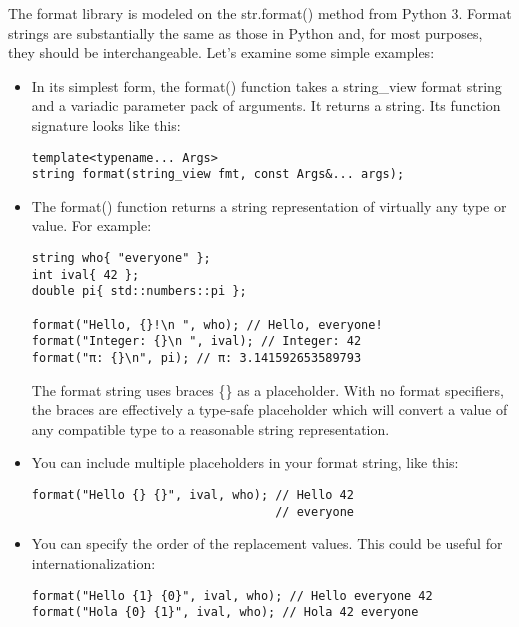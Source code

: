 The format library is modeled on the str.format() method from Python 3. Format strings are substantially the same as those in Python and, for most purposes, they should be interchangeable. Let's examine some simple examples:

\begin{itemize}
\item 
In its simplest form, the format() function takes a string\_view format string and a variadic parameter pack of arguments. It returns a string. Its function signature looks like this:

\begin{lstlisting}[style=styleCXX]
template<typename... Args>
string format(string_view fmt, const Args&... args);
\end{lstlisting}

\item 
The format() function returns a string representation of virtually any type or value. For example:

\begin{lstlisting}[style=styleCXX]
string who{ "everyone" };
int ival{ 42 };
double pi{ std::numbers::pi };

format("Hello, {}!\n ", who); // Hello, everyone!
format("Integer: {}\n ", ival); // Integer: 42
format("π: {}\n", pi); // π: 3.141592653589793
\end{lstlisting}

The format string uses braces \{\} as a placeholder. With no format specifiers, the braces are effectively a type-safe placeholder which will convert a value of any compatible type to a reasonable string representation.

\item 
You can include multiple placeholders in your format string, like this:

\begin{lstlisting}[style=styleCXX]
format("Hello {} {}", ival, who); // Hello 42
								  // everyone
\end{lstlisting}

\item 
You can specify the order of the replacement values. This could be useful for internationalization:

\begin{lstlisting}[style=styleCXX]
format("Hello {1} {0}", ival, who); // Hello everyone 42
format("Hola {0} {1}", ival, who); // Hola 42 everyone
\end{lstlisting}


\end{itemize}
